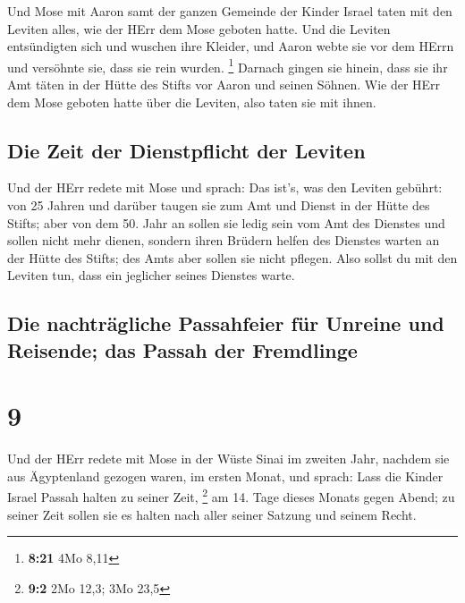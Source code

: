 Und Mose mit Aaron samt der ganzen Gemeinde der Kinder
Israel taten mit den Leviten alles, wie der HErr dem Mose geboten hatte.
 Und die Leviten entsündigten sich und wuschen ihre
Kleider, und Aaron webte sie vor dem HErrn und versöhnte sie, dass sie
rein wurden. \footnote{\textbf{8:21} 4Mo 8,11}  Darnach
gingen sie hinein, dass sie ihr Amt täten in der Hütte des Stifts vor
Aaron und seinen Söhnen. Wie der HErr dem Mose geboten hatte über die
Leviten, also taten sie mit ihnen.

\hypertarget{die-zeit-der-dienstpflicht-der-leviten}{%
\subsection{Die Zeit der Dienstpflicht der
Leviten}\label{die-zeit-der-dienstpflicht-der-leviten}}

 Und der HErr redete mit Mose und sprach: 
Das ist's, was den Leviten gebührt: von 25 Jahren und darüber taugen sie
zum Amt und Dienst in der Hütte des Stifts;  aber von dem
50. Jahr an sollen sie ledig sein vom Amt des Dienstes und sollen nicht
mehr dienen,  sondern ihren Brüdern helfen des Dienstes
warten an der Hütte des Stifts; des Amts aber sollen sie nicht pflegen.
Also sollst du mit den Leviten tun, dass ein jeglicher seines Dienstes
warte.

\hypertarget{die-nachtruxe4gliche-passahfeier-fuxfcr-unreine-und-reisende-das-passah-der-fremdlinge}{%
\subsection{Die nachträgliche Passahfeier für Unreine und Reisende; das
Passah der
Fremdlinge}\label{die-nachtruxe4gliche-passahfeier-fuxfcr-unreine-und-reisende-das-passah-der-fremdlinge}}

\hypertarget{section-8}{%
\section{9}\label{section-8}}

 Und der HErr redete mit Mose in der Wüste Sinai im
zweiten Jahr, nachdem sie aus Ägyptenland gezogen waren, im ersten
Monat, und sprach:  Lass die Kinder Israel Passah halten
zu seiner Zeit, \footnote{\textbf{9:2} 2Mo 12,3; 3Mo 23,5}
 am 14. Tage dieses Monats gegen Abend; zu seiner Zeit
sollen sie es halten nach aller seiner Satzung und seinem Recht.

